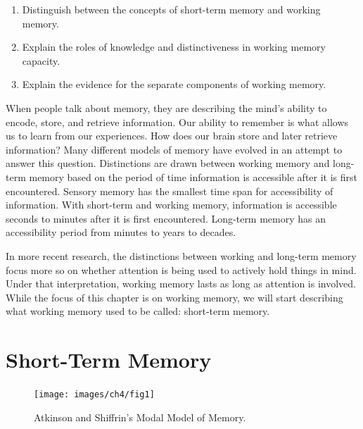 \documentclass[
]{krantz}
\providecommand{\tightlist}{%
  \setlength{\itemsep}{0pt}\setlength{\parskip}{0pt}}
\begin{document}
\begin{enumerate}
\def\labelenumi{\arabic{enumi}.}
\tightlist
\item
  Distinguish between the concepts of short-term memory and working memory.
\item
  Explain the roles of knowledge and distinctiveness in working memory capacity.
\item
  Explain the evidence for the separate components of working memory.
\end{enumerate}

When people talk about memory, they are describing the mind's ability to encode, store, and retrieve information. Our ability to remember is what allows us to learn from our experiences. How does our brain store and later retrieve information? Many different models of memory have evolved in an attempt to answer this question. Distinctions are drawn between working memory and long-term memory based on the period of time information is accessible after it is first encountered. Sensory memory has the smallest time span for accessibility of information. With short-term and working memory, information is accessible seconds to minutes after it is first encountered. Long-term memory has an accessibility period from minutes to years to decades.

In more recent research, the distinctions between working and long-term memory focus more so on whether attention is being used to actively hold things in mind. Under that interpretation, working memory lasts as long as attention is involved. While the focus of this chapter is on working memory, we will start describing what working memory used to be called: short-term memory.

\section{Short-Term Memory}\label{short-term-memory}

\begin{figure}

{\centering \texttt{[image: images/ch4/fig1]} 

}

\caption{Atkinson and Shiffrin’s Modal Model of Memory.}\label{fig:modalmodel}
\end{figure}
\end{document}
